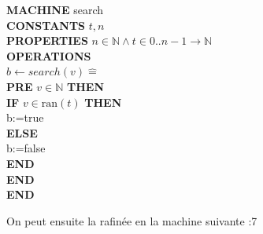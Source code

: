 \documentclass[10pt,a4paper]{article}
\newcommand{\Bequal}{\mathrel{\widehat{=}}}
\begin{document}
{\iffalse
\noindent \textbf{MACHINE} search \\
\textbf{CONSTANTS} $t,n$ \\
\textbf{PROPERTIES} 
$n \in \mathbb{N} \wedge t \in 0..n-1 \rightarrow \mathbb{N}$ \\
\textbf{OPERATIONS} \\
$b \leftarrow search(v) \Bequal$ \\
\hspace*{1em}  \textbf{PRE} $v \in \mathbb{N}$ \textbf{THEN} \\
\hspace*{2em} \textbf{IF} $v \in \text{ran}(t)$ \textbf{THEN} \\
\hspace*{2em} b:=true \\
\hspace*{2em} \textbf{ELSE} \\
\hspace*{2em} b:=false \\
\hspace*{2em} \textbf{END} \\
\hspace*{1em} \textbf{END} \\
\textbf{END}

On peut ensuite la rafinée en la machine suivante :7

}
\end{document}
